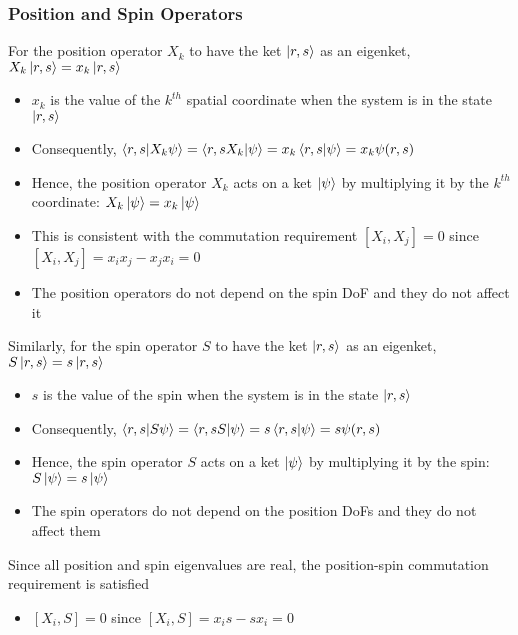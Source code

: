 \documentclass[8pt,t,mathserif,aspectratio=169]{beamer}
\begin{document}
\begin{frame}
  \frametitle{Position and Spin Operators}
  \vspace{1mm}
  For the position operator $X_k$ to have the ket $\ket{r,s}$ as an eigenket, $X_k \ket{r,s} = x_k \ket{r,s}$
  \begin{itemize}
    \item $x_k$ is the value of the $k^{th}$ spatial coordinate when the system is in the state $\ket{r,s}$
    \item Consequently, $\braket{r,s}{X_k \psi} = \bra{r,s X_k} \ket{\psi} = x_k \braket{r,s}{\psi} = x_k \psi(r,s)$
    \item Hence, the position operator $X_k$ acts on a ket $\ket{\psi}$ by multiplying it by the $k^{th}$ coordinate: $X_k \ket{\psi} = x_k \ket{\psi}$
    \item This is consistent with the commutation requirement $[X_i,X_j] = 0$ since $[X_i,X_j] = x_i x_j - x_j x_i = 0$
    \item The position operators do not depend on the spin DoF and they do not affect it
  \end{itemize}
  Similarly, for the spin operator $S$ to have the ket $\ket{r,s}$ as an eigenket, $S \ket{r,s} = s \ket{r,s}$
  \begin{itemize}
    \item $s$ is the value of the spin when the system is in the state $\ket{r,s}$
    \item Consequently, $\braket{r,s}{S \psi} = \bra{r,s S} \ket{\psi} = s \braket{r,s}{\psi} = s \psi(r,s)$
    \item Hence, the spin operator $S$ acts on a ket $\ket{\psi}$ by multiplying it by the spin: $S \ket{\psi} = s \ket{\psi}$
    \item The spin operators do not depend on the position DoFs and they do not affect them
  \end{itemize}
  Since all position and spin eigenvalues are real, the position-spin commutation requirement is satisfied
  \begin{itemize}
    \item $[X_i,S] = 0$ since $[X_i,S] = x_i s - s x_i = 0$
  \end{itemize}
\end{frame}
\end{document}
